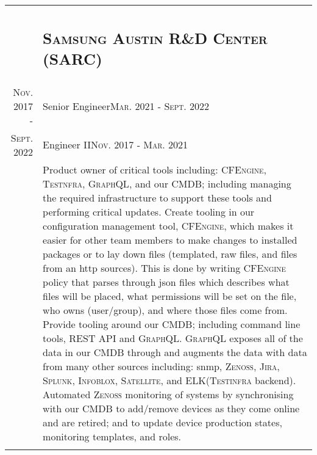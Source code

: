 \documentclass[letterpaper,10pt]{article}
\newenvironment{table_itemize}
{
	\begingroup
	\begin{minipage}[t]{\hsize}
	\footnotesize
	\raggedright
    \begin{itemize}
	\itemsep 0pt
}{
	\end{itemize}
	\end{minipage}
	\smallskip
	\endgroup
}
\begin{document}
\begin{tabular}{R|B}
	                                & \subsection{\textsc{Samsung Austin R\&D Center (SARC)}}                                        \\
	\textsc{Nov.} 2017 -            & Senior Engineer\hfill\small{\textsc{Mar.} 2021 - \textsc{Sept.} 2022}                          \\
	\textsc{Sept.} 2022\phantom{ -} & Engineer II\hfill\small{\textsc{Nov.} 2017 - \textsc{Mar.} 2021}                               \\
	                                & \footnotesize Product owner of critical tools including: \textsc{CFEngine, Testnfra, GraphQL},
	and our CMDB; including managing the required infrastructure to support these tools and performing 	critical updates.
	Create tooling in our configuration management tool, \textsc{CFEngine}, which makes it easier for other team members
	to make changes to installed packages or to lay down files (templated, raw files, and files from an http sources).
	This is done by writing \textsc{CFEngine} policy that parses through json files which describes what files will be placed,
	what permissions will be set on the file, who owns (user/group), and where those files come from. Provide tooling around our CMDB;
	including command line tools, REST API and \textsc{GraphQL}. \textsc{GraphQL} exposes all of the data in our CMDB through and
	augments the data with data from many other sources including: snmp, \textsc{Zenoss, Jira, Splunk, Infoblox, Satellite},
	and \textsc{ELK}(\textsc{Testinfra} backend). Automated \textsc{Zenoss} monitoring of systems by synchronising with our
	CMDB to add/remove devices as they come online and are retired; and to update device production states, monitoring templates,
	and roles.                                                                                                                       \\
	                                                                                                             \\


\end{tabular}
\end{document}
